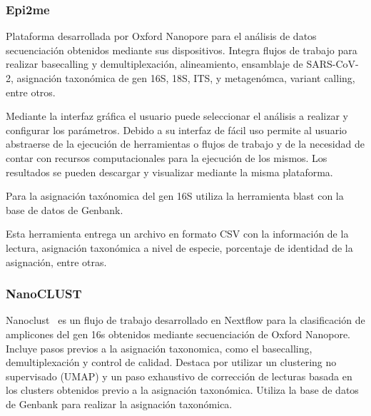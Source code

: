 \subsubsection{Epi2me}
Plataforma desarrollada por Oxford Nanopore para el análisis de datos secuenciación obtenidos mediante sus dispositivos. 
Integra flujos de trabajo para realizar basecalling y demultiplexación, alineamiento, ensamblaje de SARS-CoV-2, asignación taxonómica de gen 16S, 18S, ITS, y metagenómca, variant calling, entre otros.

Mediante la interfaz gráfica el usuario puede seleccionar el análisis a realizar y configurar los parámetros. Debido a su interfaz de fácil uso permite al usuario abstraerse de la ejecución de herramientas o flujos de trabajo y de la necesidad de contar con recursos computacionales para la ejecución de los mismos.
Los resultados se pueden descargar y visualizar mediante la misma plataforma.


Para la asignación taxónomica del gen 16S utiliza la herramienta blast con la base de datos de Genbank.

Esta herramienta entrega un archivo en formato CSV con la información de la lectura, asignación taxonómica a nivel de especie, porcentaje de identidad de la asignación, entre otras.
\subsubsection{NanoCLUST}
Nanoclust~\cite{10.1093/bioinformatics/btaa900} es un flujo de trabajo desarrollado en Nextflow para la clasificación de amplicones del gen 16s obtenidos mediante secuenciación de Oxford Nanopore. Incluye pasos previos a la asignación taxonomica, como el basecalling, demultiplexación y control de calidad. Destaca por utilizar un clustering no supervisado (UMAP) y un paso exhaustivo de corrección de lecturas basada en los clusters obtenidos previo a la asignación taxonómica.
Utiliza la base de datos de Genbank para realizar la asignación taxonómica.

